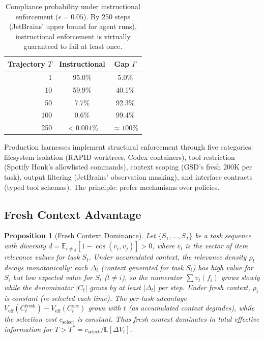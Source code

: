 \documentclass[11pt, a4paper, copyright]{googledeepmind}
\newtheorem{proposition}{Proposition}[section]
\begin{document}
\begin{table}[h]
\centering
\small
\begin{tabular}{rcc}
\toprule
\textbf{Trajectory $T$} & \textbf{Instructional} & \textbf{Gap $\Gamma$} \\
\midrule
1 & 95.0\% & 5.0\% \\
10 & 59.9\% & 40.1\% \\
50 & 7.7\% & 92.3\% \\
100 & 0.6\% & 99.4\% \\
250 & $< 0.001\%$ & $\approx 100\%$ \\
\bottomrule
\end{tabular}
\caption{Compliance probability under instructional enforcement ($\epsilon = 0.05$). By 250 steps (JetBrains' upper bound for agent runs), instructional enforcement is virtually guaranteed to fail at least once.}
\label{tab:compliance}
\end{table}

Production harnesses implement structural enforcement through five categories: filesystem isolation (RAPID worktrees, Codex containers), tool restriction (Spotify Honk's allowlisted commands), context scoping (GSD's fresh 200K per task), output filtering (JetBrains' observation masking), and interface contracts (typed tool schemas). The principle: prefer mechanisms over policies.

\subsection{Fresh Context Advantage}

\begin{proposition}[Fresh Context Dominance]
\label{thm:fresh}
Let $\{S_1, \ldots, S_T\}$ be a task sequence with \emph{diversity} $d = \mathbb{E}_{i \neq j}[1 - \cos(v_i, v_j)] > 0$, where $v_t$ is the vector of item relevance values for task $S_t$. Under accumulated context, the relevance density $\rho_t$ decays monotonically: each $\Delta_i$ (context generated for task $S_i$) has high value for $S_i$ but low expected value for $S_t$ ($t \neq i$), so the numerator $\sum v_t(f_i)$ grows slowly while the denominator $|C_t|$ grows by at least $|\Delta_t|$ per step. Under fresh context, $\rho_t$ is constant (re-selected each time). The per-task advantage $V_{\text{eff}}(C_t^{\text{fresh}}) - V_{\text{eff}}(C_t^{\text{acc}})$ grows with $t$ (as accumulated context degrades), while the selection cost $c_{\text{select}}$ is constant. Thus fresh context dominates in total effective information for $T > T^* = c_{\text{select}} / \mathbb{E}[\Delta V_t]$.
\end{proposition}
\end{document}
